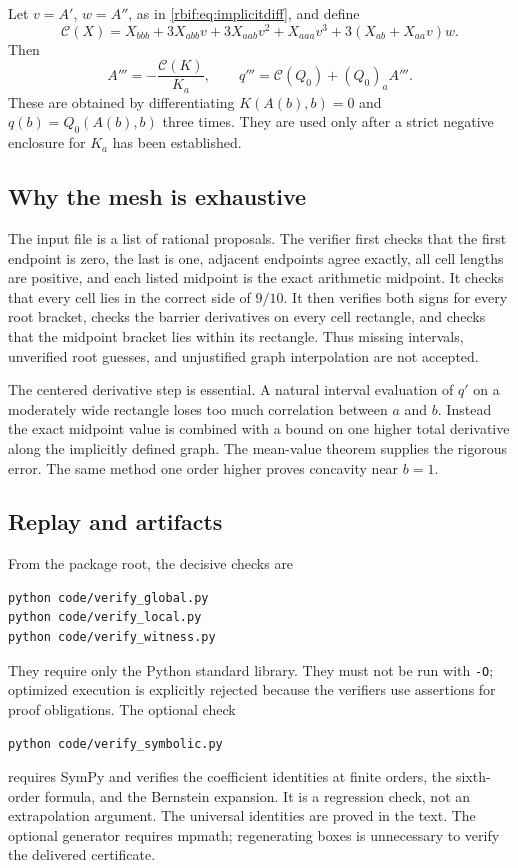 Let $v=A'$, $w=A''$, as in \eqref{rbif:eq:implicitdiff}, and define
\begin{equation}
 \mathcal C(X)=X_{bbb}+3X_{abb}v+3X_{aab}v^2+X_{aaa}v^3
                   +3(X_{ab}+X_{aa}v)w.
 \label{rbif:eq:Cderiv}
\end{equation}
Then
\[
 A'''=-\frac{\mathcal C(K)}{K_a},\qquad
 q'''=\mathcal C(Q_0)+(Q_0)_aA'''.
\]
These are obtained by differentiating $K(A(b),b)=0$ and
$q(b)=Q_0(A(b),b)$ three times. They are used only after a strict
negative enclosure for $K_a$ has been established.

\subsection{Why the mesh is exhaustive}
The input file  is a list of rational proposals.
The verifier first checks that the first endpoint is zero, the last is
one, adjacent endpoints agree exactly, all cell lengths are positive,
and each listed midpoint is the exact arithmetic midpoint. It checks
that every cell lies in the correct side of $9/10$. It then verifies both
signs for every root bracket, checks the barrier derivatives on every
cell rectangle, and checks that the midpoint bracket lies within its
rectangle. Thus missing intervals, unverified root guesses, and
unjustified graph interpolation are not accepted.

The centered derivative step is essential. A natural interval evaluation
of $q'$ on a moderately wide rectangle loses too much correlation between
$a$ and $b$. Instead the exact midpoint value is combined with a bound on
one higher total derivative along the implicitly defined graph. The
mean-value theorem supplies the rigorous error. The same method one order
higher proves concavity near $b=1$.

\subsection{Replay and artifacts}
From the package root, the decisive checks are
\begin{verbatim}
python code/verify_global.py
python code/verify_local.py
python code/verify_witness.py
\end{verbatim}
They require only the Python standard library. They must not be run with
\texttt{-O}; optimized execution is explicitly rejected because the
verifiers use assertions for proof obligations. The optional check
\begin{verbatim}
python code/verify_symbolic.py
\end{verbatim}
requires SymPy and verifies the coefficient identities at finite orders,
the sixth-order formula, and the Bernstein expansion. It is a regression
check, not an extrapolation argument. The universal identities are proved
in the text. The optional generator  requires mpmath;
regenerating boxes is unnecessary to verify the delivered certificate.


